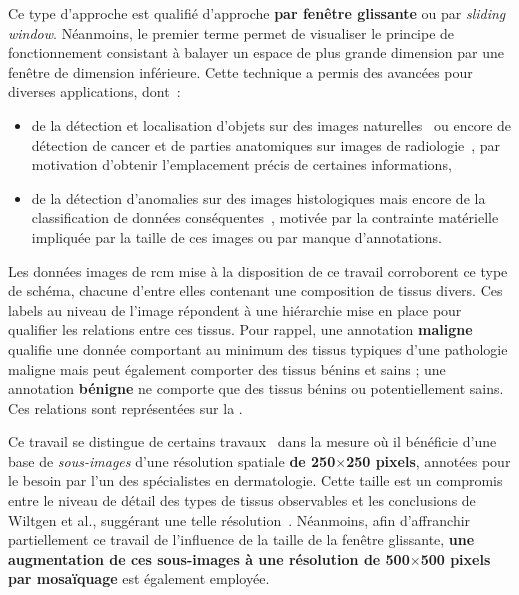 Ce type d'approche est qualifié d'approche \textbf{par fenêtre glissante} ou par \textit{sliding window}. Néanmoins, le premier terme permet de visualiser le principe de fonctionnement consistant à balayer un espace de plus grande dimension par une fenêtre de dimension inférieure. Cette technique a permis des avancées pour diverses applications, dont~: 
\begin{itemize}
    \item de la détection et localisation d'objets sur des images naturelles~\cite{Harzallah2009} ou encore de détection de cancer et de parties anatomiques sur images de radiologie~\cite{Helwan2017}, par motivation d'obtenir l'emplacement précis de certaines informations,
    \item de la détection d'anomalies sur des images histologiques mais encore de la classification de données conséquentes~\cite{Hou2016,Alqudah2019,Wei2019}, motivée par la contrainte matérielle impliquée par la taille de ces images ou par manque d'annotations.
\end{itemize}\par

Les données images de \gls{rcm} mise à la disposition de ce travail corroborent ce type de schéma, chacune d'entre elles contenant une composition de tissus divers. Ces labels au niveau de l'image répondent à une hiérarchie mise en place pour qualifier les relations entre ces tissus. Pour rappel, une annotation \textbf{maligne} qualifie une donnée comportant au minimum des tissus typiques d'une pathologie maligne mais peut également comporter des tissus bénins et sains ; une annotation \textbf{bénigne} ne comporte que des tissus bénins ou potentiellement sains. Ces relations sont représentées sur la .\par

Ce travail se distingue de certains travaux~\cite{Hou2016,Alqudah2019} dans la mesure où il bénéficie d'une base de \textit{sous-images} d'une résolution spatiale \textbf{de 250$\times$250 pixels}, annotées pour le besoin par l'un des spécialistes en dermatologie. Cette taille est un compromis entre le niveau de détail des types de tissus observables et les conclusions de Wiltgen et al., suggérant une telle résolution~\cite{Wiltgen2008}. Néanmoins, afin d'affranchir partiellement ce travail de l'influence de la taille de la fenêtre glissante, \textbf{une augmentation de ces sous-images à une résolution \textbf{de 500$\times$500 pixels} par mosaïquage} est également employée.\par

